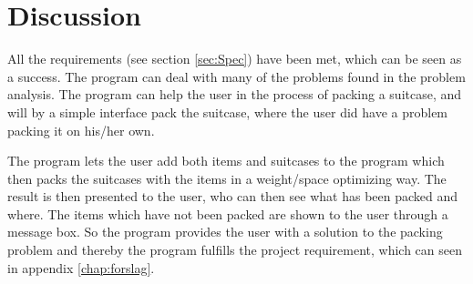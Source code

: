 \section{Discussion}


All the requirements (see section \ref{sec:Spec}) have been met, which can be seen as a success. The program can deal with many of the problems found in the problem analysis. The program can help the user in the process of packing a suitcase, and will by a simple interface pack the suitcase, where the user did have a problem packing it on his/her own.



The program lets the user add both items and suitcases to the program which then packs the suitcases with the items in a weight/space optimizing way. The result is then presented to the user, who can then see what has been packed and where. The items which have not been packed are shown to the user through a message box. So the program provides the user with a solution to the packing problem and thereby the program fulfills the project requirement, which can seen in appendix \ref{chap:forslag}.

